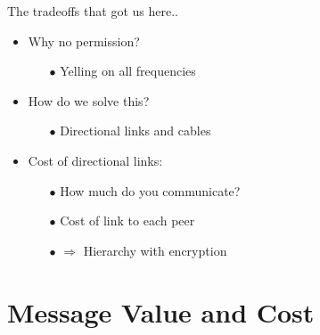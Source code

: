 \documentclass{beamer}
\begin{document}
\begin{frame}{The tradeoffs that got us here..}
\begin{minipage}[t]{0.4\textwidth}
  \end{minipage}%
\begin{minipage}[t]{0.6\textwidth} %
    \small %
    \setlength{\parskip}{6pt} %

\begin{itemize}
    \pause
    \item Why no permission?
    \pause
    \begin{itemize}
        \item[$\bullet$] Yelling on all frequencies
    \end{itemize}

    \pause
    \item How do we solve this?
    \pause
    \begin{itemize}
        \item[$\bullet$] Directional links and cables
    \end{itemize}

    \item Cost of directional links:
    \begin{itemize}
        \item[$\bullet$] How much do you communicate?
        \item[$\bullet$] Cost of link to each peer
        \item[$\bullet$] $\Rightarrow$ Hierarchy with encryption
    \end{itemize}
\end{itemize}

\end{minipage}
\end{frame}



\section{Message Value and Cost}
\end{document}
